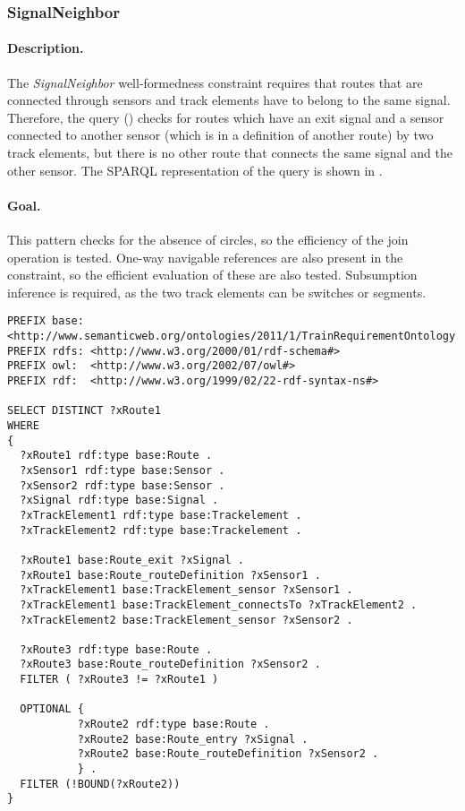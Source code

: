 \subsubsection{SignalNeighbor}

\paragraph{Description.} The \textit{SignalNeighbor} well-formedness constraint requires that routes that are connected through sensors and track elements have to belong to the same signal. Therefore, the query () checks for routes which have an exit signal and a sensor connected to another sensor (which is in a definition of another route) by two track elements, but there is no other route that connects the same signal and the other sensor. The SPARQL representation of the query is shown in .

\paragraph{Goal.} This pattern checks for the absence of circles, so the efficiency of the join operation is tested. One-way navigable references are also present in the constraint, so the efficient evaluation of these are also tested. Subsumption inference is required, as the two track elements can be switches or segments.

\begin{lstlisting}[caption=The RouteSensor query in SPARQL, label=lst:signalneighbor-sparql]
PREFIX base: <http://www.semanticweb.org/ontologies/2011/1/TrainRequirementOntology.owl#>
PREFIX rdfs: <http://www.w3.org/2000/01/rdf-schema#>
PREFIX owl:  <http://www.w3.org/2002/07/owl#>
PREFIX rdf:  <http://www.w3.org/1999/02/22-rdf-syntax-ns#>

SELECT DISTINCT ?xRoute1
WHERE
{
  ?xRoute1 rdf:type base:Route .
  ?xSensor1 rdf:type base:Sensor .
  ?xSensor2 rdf:type base:Sensor .
  ?xSignal rdf:type base:Signal .
  ?xTrackElement1 rdf:type base:Trackelement .
  ?xTrackElement2 rdf:type base:Trackelement .
  
  ?xRoute1 base:Route_exit ?xSignal .
  ?xRoute1 base:Route_routeDefinition ?xSensor1 .
  ?xTrackElement1 base:TrackElement_sensor ?xSensor1 .
  ?xTrackElement1 base:TrackElement_connectsTo ?xTrackElement2 .
  ?xTrackElement2 base:TrackElement_sensor ?xSensor2 .
  
  ?xRoute3 rdf:type base:Route .
  ?xRoute3 base:Route_routeDefinition ?xSensor2 .
  FILTER ( ?xRoute3 != ?xRoute1 )
  
  OPTIONAL { 
           ?xRoute2 rdf:type base:Route .
           ?xRoute2 base:Route_entry ?xSignal .
           ?xRoute2 base:Route_routeDefinition ?xSensor2 .
           } .
  FILTER (!BOUND(?xRoute2))
}
\end{lstlisting}

